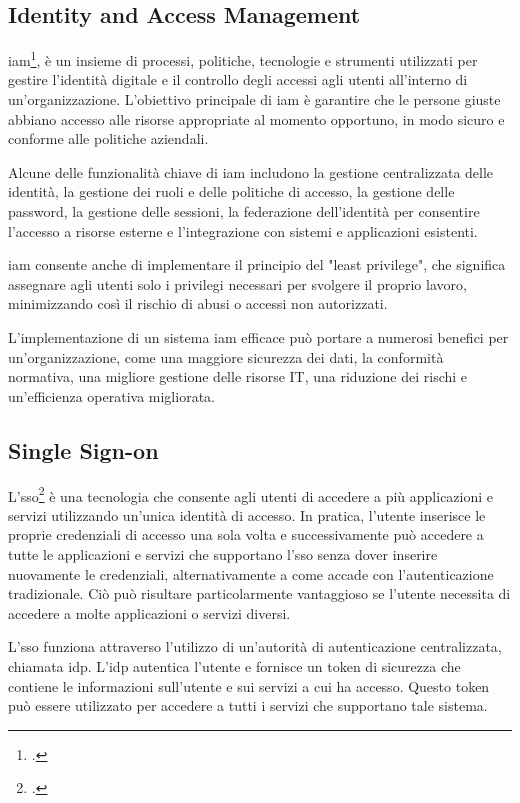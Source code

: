 \subsection{Identity and Access Management}

\acrshort{iam}\footcite{site:iam}, è un insieme di processi, politiche, tecnologie e strumenti utilizzati per gestire l'identità digitale e il controllo degli accessi agli utenti all'interno di un'organizzazione. L'obiettivo principale di \acrshort{iam} è garantire che le persone giuste abbiano accesso alle risorse appropriate al momento opportuno, in modo sicuro e conforme alle politiche aziendali.

Alcune delle funzionalità chiave di \acrshort{iam} includono la gestione centralizzata delle identità, la gestione dei ruoli e delle politiche di accesso, la gestione delle password, la gestione delle sessioni, la federazione dell'identità per consentire l'accesso a risorse esterne e l'integrazione con sistemi e applicazioni esistenti.

\acrshort{iam} consente anche di implementare il principio del "least privilege", che significa assegnare agli utenti solo i privilegi necessari per svolgere il proprio lavoro, minimizzando così il rischio di abusi o accessi non autorizzati.

L'implementazione di un sistema \acrshort{iam} efficace può portare a numerosi benefici per un'organizzazione, come una maggiore sicurezza dei dati, la conformità normativa, una migliore gestione delle risorse IT, una riduzione dei rischi e un'efficienza operativa migliorata.


\subsection{Single Sign-on}

L'\acrshort{sso}\footcite{site:sso} è una tecnologia che consente agli utenti di accedere a più applicazioni e servizi utilizzando un'unica identità di accesso. In pratica, l'utente inserisce le proprie credenziali di accesso una sola volta e successivamente può accedere a tutte le applicazioni e servizi che supportano l'\acrshort{sso} senza dover inserire nuovamente le credenziali, alternativamente a come accade con l'autenticazione tradizionale. Ciò può risultare particolarmente vantaggioso se l'utente necessita di accedere a molte applicazioni o servizi diversi.

L'\acrshort{sso} funziona attraverso l'utilizzo di un'autorità di autenticazione centralizzata, chiamata \acrfull{idp}. L'\acrshort{idp} autentica l'utente e fornisce un token di sicurezza che contiene le informazioni sull'utente e sui servizi a cui ha accesso. Questo token può essere utilizzato per accedere a tutti i servizi che supportano tale sistema.

